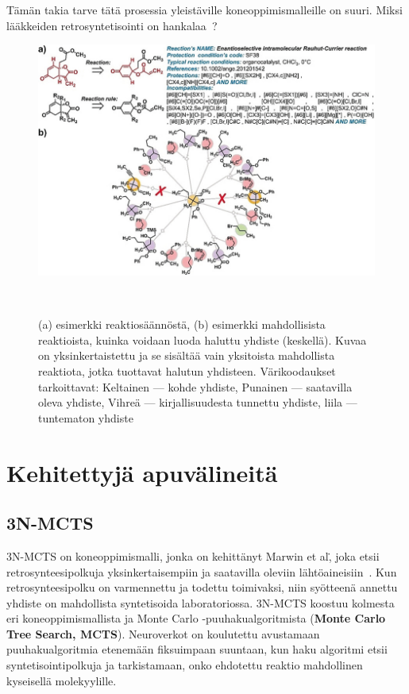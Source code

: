 \documentclass[finnish,twoside,censored,tkt,sw-line]{HYthesisML}
\begin{document}
Tämän takia tarve tätä prosessia yleistäville koneoppimismalleille on suuri.
Miksi lääkkeiden retrosyntetisointi on hankalaa~\cite{ButlerKeithT2018Mlfm,deAlmeidaA.Filipa2019Socd}?
\begin{figure}
    \centering
    \includegraphics[width=\textwidth]{retrosynthesis.jpg}
    \caption{(a) esimerkki reaktiosäännöstä, (b) esimerkki mahdollisista reaktioista, kuinka voidaan luoda haluttu yhdiste (keskellä).
        Kuvaa on yksinkertaistettu ja se sisältää vain yksitoista mahdollista reaktiota, jotka tuottavat halutun yhdisteen.
        Värikoodaukset tarkoittavat: Keltainen --- kohde yhdiste, Punainen --- saatavilla oleva yhdiste, Vihreä --- kirjallisuudesta tunnettu yhdiste, liila --- tuntematon yhdiste}
    {~\cite{ExpertKnowledgeRetorsynthesis}}
\end{figure}

\section{Kehitettyjä apuvälineitä}

\subsection{3N-MCTS}

3N-MCTS on koneoppimismalli, jonka on kehittänyt Marwin et al\., joka etsii retrosynteesipolkuja yksinkertaisempiin ja saatavilla oleviin lähtöaineisiin~\cite{SeglerMarwinHS2018Pcsw}.
Kun retrosynteesipolku on varmennettu ja todettu toimivaksi, niin syötteenä annettu yhdiste on mahdollista syntetisoida laboratoriossa.
3N-MCTS koostuu kolmesta eri koneoppimismallista ja Monte Carlo -puuhakualgoritmista (\textbf{Monte Carlo Tree Search, MCTS}).
Neuroverkot on koulutettu avustamaan puuhakualgoritmia etenemään fiksuimpaan suuntaan, kun haku algoritmi etsii syntetisointipolkuja ja tarkistamaan, onko ehdotettu reaktio mahdollinen kyseisellä molekyylille.
\end{document}

